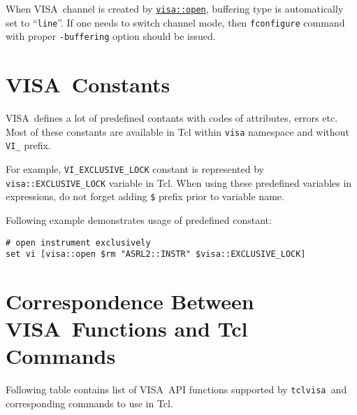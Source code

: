 \documentclass[12pt, a4paper]{report}
\newcommand{\tclvisa}{{\tt tclvisa }}
\newcommand{\VISA}{\mbox{VISA }}
\newcommand{\COMMANDREF}[1]{{\tt \hyperref[#1]{#1}}}
\newcommand{\TCLCOMMANDREF}[1]{{\tt \mbox{#1}}\index{#1}}
\begin{document}
When \VISA channel is created by \COMMANDREF{visa::open}, buffering type is automatically set to ``{\tt line}''. If one needs to switch channel mode, then \TCLCOMMANDREF{fconfigure} command with proper {\tt -buffering} option should be issued.

\section{\VISA Constants}

\VISA defines a lot of predefined contants with codes of attributes, errors etc. Most of these constants are available in Tcl within {\tt visa} namespace and without {\tt VI\_} prefix.

For example, {\tt VI\_EXCLUSIVE\_LOCK} constant is represented by \\{\tt visa::EXCLUSIVE\_LOCK} variable in Tcl. When using these predefined variables in expressions, do not forget adding {\tt \$} prefix prior to variable name.

Following example demonstrates usage of predefined constant:

\begin{verbatim} 
# open instrument exclusively
set vi [visa::open $rm "ASRL2::INSTR" $visa::EXCLUSIVE_LOCK]
\end{verbatim} 

\section{Correspondence Between \VISA Functions and Tcl Commands}
\label{sec_correspondence}

Following table contains list of \VISA API functions supported by \tclvisa and corresponding commands to use in Tcl.
\end{document}

